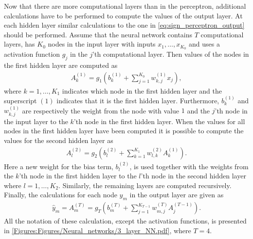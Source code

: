 Now that there are more computational layers than in the perceptron, additional calculations have to be performed to compute the values of the output layer. At each hidden layer similar calculations to the one in \eqref{eq:sign_perceptron_output} should be performed. Assume that the neural network contains $T$ computational layers, has $K_0$ nodes in the input layer with inputs $x_1,\ldots, x_{K_0}$ and uses a activation function $g_j$ in the $j$'th computational layer. Then values of the nodes in the first hidden layer are computed as
\begin{align*}
    A^{(1)}_k = g_1\left(b_{k}^{(1)} + \sum_{j=1}^{K_0} w_{k,j}^{(1)}x_j\right),
\end{align*}
where $k = 1,\ldots,K_1$ indicates which node in the first hidden layer and the superscript $(1)$ indicates that it is the first hidden layer. Furthermore, $b_{k}^{(1)}$ and $w_{k,j}^{(1)}$ are respectively the weight from the node with value $1$ and the $j$'th node in the input layer to the $k$'th node in the first hidden layer. When the values for all nodes in the first hidden layer have been computed it is possible to compute the values for the second hidden layer as
\begin{align*}
    A^{(2)}_l = g_2\left(b_{l}^{(2)} + \sum_{k=1}^{K_1} w_{l,k}^{(2)}A_k^{(1)}\right).
\end{align*}
Here a new weight for the bias term, $b_{l}^{(2)}$, is used together with the weights from the $k$'th node in the first hidden layer to the $l$'th node in the second hidden layer where $l = 1,\ldots, K_2$. Similarly, the remaining layers are computed recursively. Finally, the calculations for each node $\hat{y}_m$ in the output layer are given as
\begin{align*}
    \hat{y}_m = A^{(T)}_m = g_T\left(b_{m}^{(T)} + \sum_{j=1}^{K_{T-1}} w_{m,j}^{(T)}A_j^{(T-1)}\right).
\end{align*}
All the notation of these calculation, except the activation functions, is presented in \autoref{Figures:Figures/Neural_networks/3_layer_NN.pdf}, where $T = 4$. 

